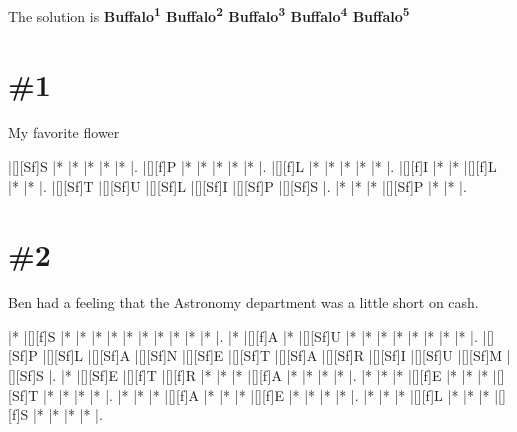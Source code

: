 \documentclass[letterpaper]{article}
\begin{document}
The solution is \textbf{Buffalo\textsuperscript{1} Buffalo\textsuperscript{2} Buffalo\textsuperscript{3} Buffalo\textsuperscript{4} Buffalo\textsuperscript{5}}

\newpage
\section*{\#1}
My favorite flower

\vspace*{1em}
\begin{Puzzle}{6}{6}
|[][Sf]S  |*        |*        |*        |*        |*        |. 
|[][f]P   |*        |*        |*        |*        |*        |.  
|[][f]L   |*        |*        |*        |*        |*        |.
|[][f]I   |*        |*        |[][f]L   |*        |*        |.  
|[][Sf]T  |[][Sf]U  |[][Sf]L  |[][Sf]I  |[][Sf]P  |[][Sf]S  |.
|*        |*        |*        |[][Sf]P  |*        |*        |. 
\end{Puzzle}

\section*{\#2}
Ben had a feeling that the Astronomy department was a little short on cash.
\vspace*{1em}
\begin{Puzzle}{12}{8}
|*        |[][f]S   |*        |*        |*        |*        |*        |*        |*        |*        |*        |*        |.
|*        |[][f]A   |*        |[][Sf]U  |*        |*        |*        |*        |*        |*        |*        |*        |.
|[][Sf]P  |[][Sf]L  |[][Sf]A  |[][Sf]N  |[][Sf]E  |[][Sf]T  |[][Sf]A  |[][Sf]R  |[][Sf]I  |[][Sf]U  |[][Sf]M  |[][Sf]S  |.
|*        |[][Sf]E  |[][f]T   |[][f]R   |*        |*        |*        |[][f]A   |*        |*        |*        |*        |.
|*        |*        |*        |[][f]E   |*        |*        |*        |[][Sf]T  |*        |*        |*        |*        |.
|*        |*        |*        |[][f]A   |*        |*        |*        |[][f]E   |*        |*        |*        |*        |.
|*        |*        |*        |[][f]L   |*        |*        |*        |[][f]S   |*        |*        |*        |*        |.
\end{Puzzle}
\end{document}
